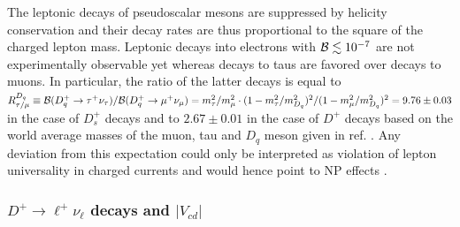 The leptonic decays of pseudoscalar mesons 
are suppressed by helicity conservation and their decay rates are thus proportional to the square of 
the charged lepton mass. Leptonic decays into electrons with ${\cal B}\lesssim 10^{-7}$ are not experimentally 
observable yet whereas decays to taus are favored over decays to muons. In particular, the ratio of the 
latter decays is equal to 
$R^{D_q}_{\tau/\mu}\equiv {\cal B}(D^+_q\to\tau^+\nu_{\tau})/{\cal B}(D^+_q\to\mu^+\nu_{\mu})=m_{\tau}^2/m_{\mu}^2\cdot(1-m^2_{\tau}/m^2_{D_q})^2/(1-m^2_{\mu}/m^2_{D_q})^2=9.76\pm0.03$ 
in the case of $D_s^+$ decays and to $2.67\pm0.01$ in the case of $D^+$ decays based on the world average masses of the muon, tau and 
$D_q$ meson given in ref. \cite{PDG_2012}. 
Any deviation from this expectation could only be interpreted as violation of lepton universality in charged 
currents and would hence point to NP effects \cite{Filipuzzi:2012mg}.


\subsubsection{$D^+\to \ell^+\nu_{\ell}$ decays and $|V_{cd}|$}


